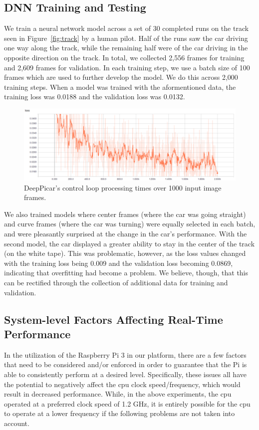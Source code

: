 \subsection{DNN Training and Testing}
We train a neural network model across a set of 30 completed runs on 
the track seen in Figure~\ref{fig:track} by a human pilot. Half of 
the runs saw the car driving one way along the track, while the 
remaining half were of the car driving in the opposite direction on 
the track. In total, we collected 2,556 frames for training and 2,609 
frames for validation. In each training step, we use a batch size of 
100 frames which are used to further develop the model. We do this 
across 2,000 training steps. When a model was trained with the 
aformentioned data, the training loss was 0.0188 and the validation 
loss was 0.0132. 

\begin{figure}[t]
  \centering
  \includegraphics[width=.55\textwidth]{figs/TrainingLoss}
  \caption{DeepPicar's control loop processing times over 1000 input 
image frames.}
  \label{fig:modelloss}
\end{figure}

We also trained models where center frames (where the car was going 
straight) and curve frames (where the car was turning) were equally 
selected in each batch, and were pleasantly surprised at the change 
in the car's performance. With the second model, the car displayed a 
greater ability to stay in the center of the track (on the white 
tape). This was problematic, however, as the loss values changed with 
the training loss being 0.009 and the validation loss becoming 
0.0869, indicating that overfitting had become a problem. We believe, 
though, that this can be rectified through the collection of 
additional data for training and validation.

\subsection{System-level Factors Affecting Real-Time Performance}
In the utilization of the Raspberry Pi 3 in our platform, there are a
few factors that need to be considered and/or enforced in order to
guarantee that the Pi is able to consistently perform at a desired
level. Specifically, these issues all have the potential to negatively
affect the cpu clock speed/frequency, which would result in decreased
performance. While, in the above experiments, the cpu operated at a
preferred clock speed of 1.2 GHz, it is entirely possible for the cpu
to operate at a lower frequency if the following problems are not
taken into account. 

